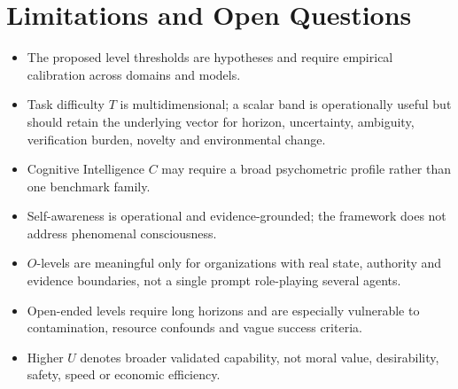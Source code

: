 \documentclass[11pt]{article}
\theoremstyle{definition}
\begin{document}
\section{Limitations and Open Questions}

\begin{itemize}
\item The proposed level thresholds are hypotheses and require empirical calibration across domains and models.
\item Task difficulty $T$ is multidimensional; a scalar band is operationally useful but should retain the underlying vector for horizon, uncertainty, ambiguity, verification burden, novelty and environmental change.
\item Cognitive Intelligence $C$ may require a broad psychometric profile rather than one benchmark family.
\item Self-awareness is operational and evidence-grounded; the framework does not address phenomenal consciousness.
\item $O$-levels are meaningful only for organizations with real state, authority and evidence boundaries, not a single prompt role-playing several agents.
\item Open-ended levels require long horizons and are especially vulnerable to contamination, resource confounds and vague success criteria.
\item Higher $U$ denotes broader validated capability, not moral value, desirability, safety, speed or economic efficiency.
\end{itemize}
\end{document}
